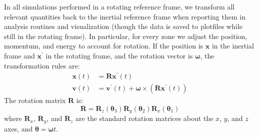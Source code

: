 \documentclass[iop]{../emulateapj}
\begin{document}
In all simulations performed in a rotating reference frame, we transform all relevant
quantities back to the inertial reference frame when reporting them in analysis routines 
and visualization (though the data is saved to plotfiles while still in the rotating frame). In particular,
for every zone we adjust the position, momentum, and energy to account for rotation.
If the position is $\mathbf{x}$ in the inertial frame and $\mathbf{x}^\prime$ in 
the rotating frame, and the rotation vector is $\bm{\omega}$, the transformation rules are:
\begin{align}  
  \mathbf{x}(t) &= \mathbf{R}\mathbf{x}^\prime(t) \\
  \mathbf{v}(t) &= \mathbf{v}^\prime(t) + \bm{\omega} \times \left(\mathbf{R} \mathbf{x}^\prime(t)\right)
\end{align}
The rotation matrix $\mathbf{R}$ is:
\begin{equation}
  \mathbf{R} = \mathbf{R}_z({\bm{\theta}}_3) \mathbf{R}_y({\bm{\theta}}_2) \mathbf{R}_x({\bm{\theta}}_1) 
\end{equation}
where $\mathbf{R}_x$, $\mathbf{R}_y$, and $\mathbf{R}_z$ are the standard rotation matrices about 
the $x$, $y$, and $z$ axes, and $\bm{\theta} = \bm{\omega} t$.



\end{document}
